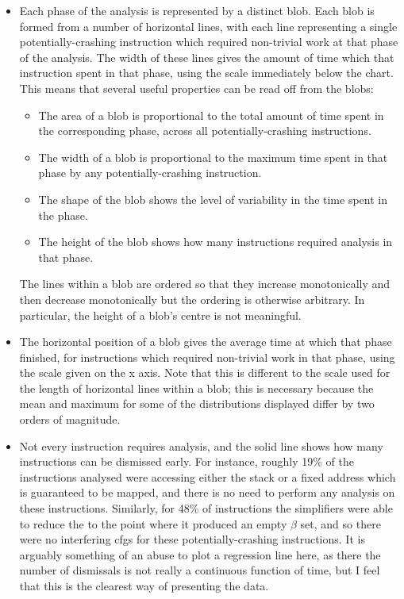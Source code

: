 \begin{itemize}
\item Each phase of the analysis is represented by a distinct blob.
  Each blob is formed from a number of horizontal lines, with each
  line representing a single potentially-crashing instruction which
  required non-trivial work at that phase of the analysis.  The width
  of these lines gives the amount of time which that instruction spent
  in that phase, using the scale immediately below the chart.  This means
  that several useful properties can be read off from the blobs:

  \begin{itemize}
  \item The area of a blob is proportional to the total amount of time
    spent in the corresponding phase, across all potentially-crashing
    instructions.
  \item The width of a blob is proportional to the maximum time spent
    in that phase by any potentially-crashing instruction.
  \item The shape of the blob shows the level of variability in the
    time spent in the phase.
  \item The height of the blob shows how many instructions required
    analysis in that phase.
  \end{itemize}

  The lines within a blob are ordered so that they increase
  monotonically and then decrease monotonically but the ordering is
  otherwise arbitrary.  In particular, the height of a blob's centre
  is not meaningful.

\item The horizontal position of a blob gives the average time at
  which that phase finished, for instructions which required
  non-trivial work in that phase, using the scale given on the x axis.
  Note that this is different to the scale used for the length of
  horizontal lines within a blob; this is necessary because the mean
  and maximum for some of the distributions displayed differ by two
  orders of magnitude.

\item Not every instruction requires analysis, and the solid line
  shows how many instructions can be dismissed early.  For instance,
  roughly 19\% of the instructions analysed were accessing either the
  stack or a fixed address which is guaranteed to be mapped, and there
  is no need to perform any analysis on these instructions.
  Similarly, for 48\% of instructions the {\StateMachine} simplifiers
  were able to reduce the {\StateMachine} to the point where it
  produced an empty $\beta$ set, and so there were no interfering
  \glspl{cfg} for these potentially-crashing instructions.  It is
  arguably something of an abuse to plot a regression line here, as
  there the number of dismissals is not really a continuous function
  of time, but I feel that this is the clearest way of presenting the
  data.


\end{itemize}
